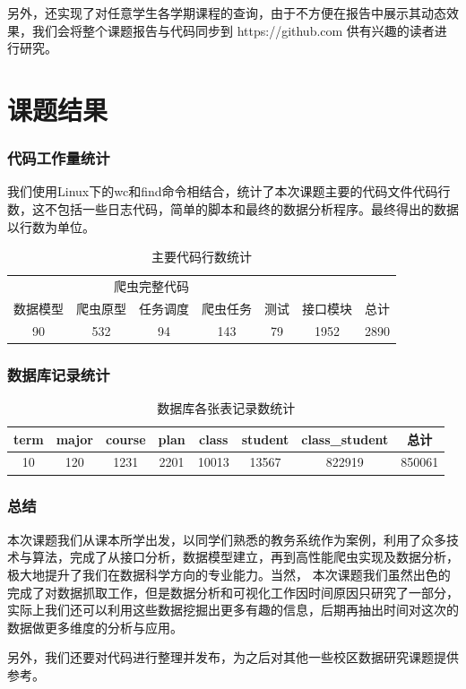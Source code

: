 \documentclass[UTF8, zihao=-4]{ctexart}
\begin{document}
    另外，还实现了对任意学生各学期课程的查询，由于不方便在报告中展示其动态效果，我们会将整个课题报告与代码同步到 https://github.com 供有兴趣的读者进行研究。
    
    \part{课题结果}
    \section{代码工作量统计}
    
    我们使用Linux下的wc和find命令相结合，统计了本次课题主要的代码文件代码行数，这不包括一些日志代码，简单的脚本和最终的数据分析程序。最终得出的数据以行数为单位。
    
    \begin{table}[htbp]
        \centering
        \begin{tabular}{ccccccc}
            \toprule
            \multicolumn{5}{c}{爬虫完整代码} \\
            \cmidrule{1-5}
            数据模型 & 爬虫原型 & 任务调度 & 爬虫任务 & 测试 & 接口模块 & 总计 \\
            \midrule
            90      & 532      & 94      & 143      & 79  & 1952     & 2890  \\
            \bottomrule
        \end{tabular}
        \caption{主要代码行数统计}
    \end{table}
    
    \section{数据库记录统计}
    
    \begin{table}[htbp]
        \centering
        \begin{tabular}{cccccccc}
            \toprule
            term & major & course & plan & class & student & class\_student & 总计  \\
            \midrule
            10   & 120   & 1231   & 2201 & 10013 & 13567   & 822919        & 850061 \\
            \bottomrule
        \end{tabular}
        \caption{数据库各张表记录数统计}
    \end{table}
    
    \section{总结}
    本次课题我们从课本所学出发，以同学们熟悉的教务系统作为案例，利用了众多技术与算法，完成了从接口分析，数据模型建立，再到高性能爬虫实现及数据分析，极大地提升了我们在数据科学方向的专业能力。当然，
    本次课题我们虽然出色的完成了对数据抓取工作，但是数据分析和可视化工作因时间原因只研究了一部分，实际上我们还可以利用这些数据挖掘出更多有趣的信息，后期再抽出时间对这次的数据做更多维度的分析与应用。\par
    另外，我们还要对代码进行整理并发布，为之后对其他一些校区数据研究课题提供参考。
    

    
\end{document}
